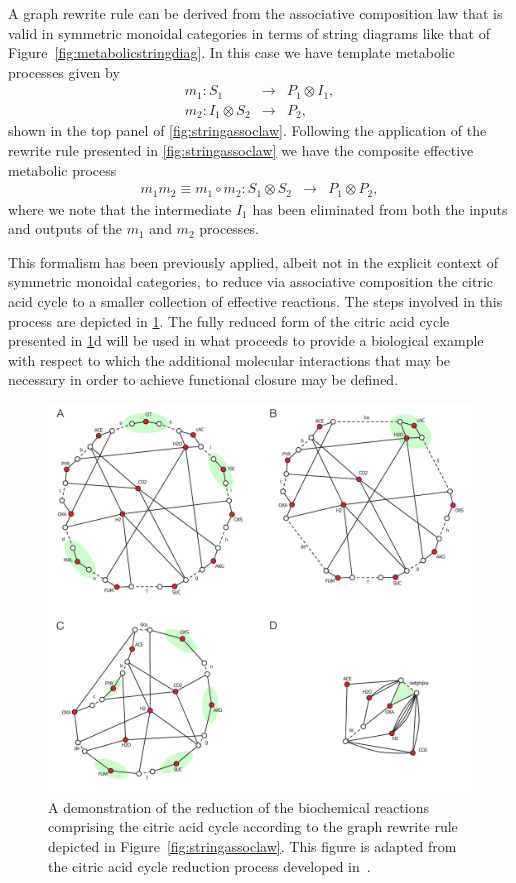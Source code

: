 A graph rewrite rule can be derived from the associative composition law that is valid in symmetric monoidal categories in terms of string diagrams like that of Figure~\ref{fig:metabolicstringdiag}. In this case we have template metabolic processes given by
\begin{eqnarray*}
m_1 \colon S_1 &\longrightarrow& P_1 \otimes I_1,\\
m_2 \colon I_1 \otimes S_2 &\longrightarrow& P_2,
\end{eqnarray*}
shown in the top panel of \ref{fig:stringassoclaw}. Following the application of the rewrite rule presented in \ref{fig:stringassoclaw} we have the composite effective metabolic process
\begin{eqnarray*}
m_{1}m_{2} \equiv m_1 \circ m_2 \colon S_1 \otimes S_2 &\longrightarrow& P_1 \otimes P_2,
\end{eqnarray*}
where we note that the intermediate $I_1$ has been eliminated from both the inputs and outputs of the $m_1$ and $m_2$ processes.

This formalism has been previously applied, albeit not in the explicit context of symmetric monoidal categories, to reduce via associative composition the citric acid cycle to a smaller collection of effective reactions. The steps involved in this process are depicted in \ref{fig:ctacycred}. The fully reduced form of the citric acid cycle presented in \ref{fig:ctacycred}d will be used in what proceeds to provide a biological example with respect to which the additional molecular interactions that may be necessary in order to achieve functional closure may be defined.

\begin{figure}
\begin{center}
\noindent\includegraphics[width=0.9\columnwidth]{fig/rTCA-reduction.pdf}
\end{center}
\caption{A demonstration of the reduction of the biochemical reactions comprising the citric acid cycle according to the graph rewrite rule depicted in Figure~\ref{fig:stringassoclaw}. This figure is adapted from the citric acid cycle reduction process developed in~\cite{Braakman2012a}.}
\label{fig:ctacycred}
\end{figure}

